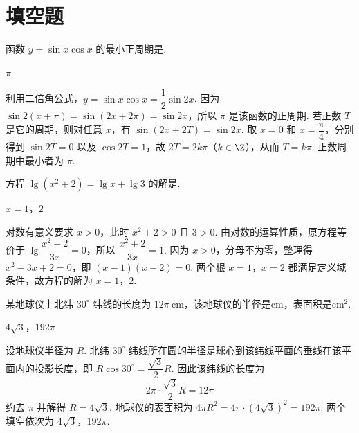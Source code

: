 \section{填空题}
\begin{problem}
函数 \(y=\sin x\cos x\) 的最小正周期是\fillinblank{}.
\begin{answer}
\(\pi\)
\end{answer}

\begin{solution}
利用二倍角公式，\(y=\sin x\cos x=\dfrac12\sin2x\). 因为 \(\sin 2(x+\pi)=\sin(2x+2\pi)=\sin2x\)，所以 \(\pi\) 是该函数的正周期. 若正数 \(T\) 是它的周期，则对任意 \(x\)，有 \(\sin(2x+2T)=\sin2x\). 取 \(x=0\) 和 \(x=\dfrac{\pi}{4}\)，分别得到 \(\sin2T=0\) 以及 \(\cos2T=1\)，故 \(2T=2k\pi\)（\(k\in\Z\)），从而 \(T=k\pi\). 正数周期中最小者为 \(\pi\).
\end{solution}

\end{problem}

\begin{problem}
方程 \(\lg(x^{2}+2)=\lg x+\lg 3\) 的解是\fillinblank{}.
\begin{answer}
\(x=1\)，\(2\)
\end{answer}

\begin{solution}
对数有意义要求 \(x>0\)，此时 \(x^{2}+2>0\) 且 \(3>0\). 由对数的运算性质，原方程等价于
\(\lg\dfrac{x^{2}+2}{3x}=0\)，所以 \(\dfrac{x^{2}+2}{3x}=1\). 因为 \(x>0\)，分母不为零，整理得 \(x^{2}-3x+2=0\)，即 \((x-1)(x-2)=0\). 两个根 \(x=1\)，\(x=2\) 都满足定义域条件，故方程的解为 \(x=1\)，\(2\).
\end{solution}

\end{problem}

\begin{problem}
某地球仪上北纬 \(30^{\circ}\) 纬线的长度为 \(12\pi\mathrm{~cm}\)，该地球仪的半径是\fillinblank{}\(\mathrm{cm}\)，表面积是\fillinblank{}\(\mathrm{cm}^{2}\).
\begin{answer}
\(4\sqrt{3}\)，\(192\pi\)
\end{answer}

\begin{solution}
设地球仪半径为 \(R\). 北纬 \(30^{\circ}\) 纬线所在圆的半径是球心到该纬线平面的垂线在该平面内的投影长度，即 \(R\cos30^{\circ}=\dfrac{\sqrt3}{2}R\). 因此该纬线的长度为
\[
2\pi\cdot\frac{\sqrt3}{2}R=12\pi
\]
约去 \(\pi\) 并解得 \(R=4\sqrt3\). 地球仪的表面积为
\(4\pi R^{2}=4\pi\cdot(4\sqrt3)^{2}=192\pi\). 两个填空依次为 \(4\sqrt3\)，\(192\pi\).
\end{solution}

\end{problem}

